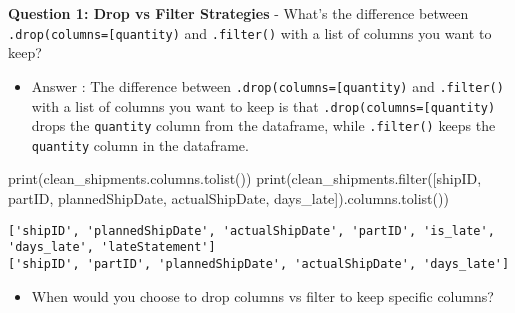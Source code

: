 \documentclass[
  letterpaper,
  DIV=11,
  numbers=noendperiod]{scrartcl}
\newenvironment{Shaded}{\begin{snugshade}}{\end{snugshade}}
\newcommand{\BuiltInTok}[1]{\textcolor[rgb]{0.00,0.23,0.31}{#1}}
\newcommand{\NormalTok}[1]{\textcolor[rgb]{0.00,0.23,0.31}{#1}}
\newcommand{\StringTok}[1]{\textcolor[rgb]{0.13,0.47,0.30}{#1}}
\providecommand{\tightlist}{%
  \setlength{\itemsep}{0pt}\setlength{\parskip}{0pt}}
\begin{document}
\begin{tcolorbox}[enhanced jigsaw, colframe=quarto-callout-important-color-frame, title=\textcolor{quarto-callout-important-color}{\faExclamation}\hspace{0.5em}{🤔 Discussion Questions: Drop Mental Model}, breakable, opacityback=0, arc=.35mm, leftrule=.75mm, titlerule=0mm, left=2mm, toptitle=1mm, rightrule=.15mm, bottomtitle=1mm, bottomrule=.15mm, opacitybacktitle=0.6, toprule=.15mm, colback=white, coltitle=black, colbacktitle=quarto-callout-important-color!10!white]

\textbf{Question 1: Drop vs Filter Strategies} - What's the difference
between
\texttt{.drop(columns={[}\textquotesingle{}quantity\textquotesingle{}{]})}
and \texttt{.filter()} with a list of columns you want to keep?

\begin{itemize}
\tightlist
\item
  Answer : The difference between
  \texttt{.drop(columns={[}\textquotesingle{}quantity\textquotesingle{}{]})}
  and \texttt{.filter()} with a list of columns you want to keep is that
  \texttt{.drop(columns={[}\textquotesingle{}quantity\textquotesingle{}{]})}
  drops the \texttt{quantity} column from the dataframe, while
  \texttt{.filter()} keeps the \texttt{quantity} column in the
  dataframe.
\end{itemize}

\begin{Shaded}
\begin{Highlighting}[]
\BuiltInTok{print}\NormalTok{(clean\_shipments.columns.tolist())}
\BuiltInTok{print}\NormalTok{(clean\_shipments.}\BuiltInTok{filter}\NormalTok{([}\StringTok{\textquotesingle{}shipID\textquotesingle{}}\NormalTok{, }\StringTok{\textquotesingle{}partID\textquotesingle{}}\NormalTok{, }\StringTok{\textquotesingle{}plannedShipDate\textquotesingle{}}\NormalTok{, }\StringTok{\textquotesingle{}actualShipDate\textquotesingle{}}\NormalTok{, }\StringTok{\textquotesingle{}days\_late\textquotesingle{}}\NormalTok{]).columns.tolist())}
\end{Highlighting}
\end{Shaded}

\begin{verbatim}
['shipID', 'plannedShipDate', 'actualShipDate', 'partID', 'is_late', 'days_late', 'lateStatement']
['shipID', 'partID', 'plannedShipDate', 'actualShipDate', 'days_late']
\end{verbatim}

\begin{itemize}
\tightlist
\item
  When would you choose to drop columns vs filter to keep specific
  columns?
\end{itemize}


\end{tcolorbox}
\end{document}
